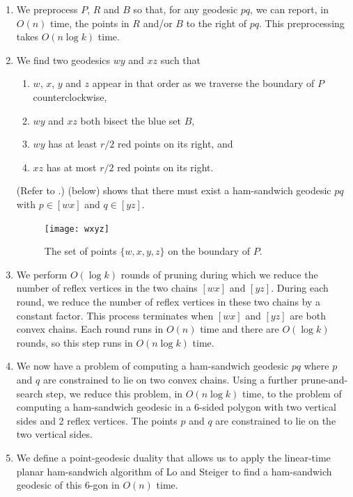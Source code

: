 \documentclass[charterfonts,lotsofwhite]{patmorin}
\newcommand{\chain}[2]{[#1#2]}
\begin{document}
\begin{enumerate}

\item We preprocess $P$, $R$ and $B$ so that, for any geodesic $pq$,
we can report, in $O(n)$ time, the points in $R$ and/or $B$ to the
right of $pq$.  This preprocessing takes $O(n \log k)$ time.

\item We find two geodesics $wy$ and $xz$ such that

\begin{enumerate}

\item $w$, $x$, $y$ and $z$ appear in that order as we traverse the
boundary of $P$ counterclockwise,

\item $wy$ and $xz$ both bisect the blue set $B$,

\item $wy$ has at least $r/2$ red points on its right, and

\item $xz$ has at most $r/2$ red points on its right.

\end{enumerate}

(Refer to .)  (below) shows that there
must exist a ham-sandwich geodesic $pq$ with $p\in \chain{w}{x}$ and
$q\in \chain{y}{z}$.

\begin{figure}[htbp]
\begin{center}\texttt{[image: wxyz]}\end{center}
\caption{The set of points $\{w,x,y,z\}$ on the boundary of $P$.}
\end{figure}

\item We perform $O(\log k)$ rounds of pruning during which we reduce
the number of reflex vertices in the two chains $\chain{w}{x}$ and
$\chain{y}{z}$.  During each round, we reduce the number of reflex
vertices in these two chains by a constant factor.  This process
terminates when $\chain{w}{x}$ and $\chain{y}{z}$ are both convex chains.
Each round runs in $O(n)$ time and there are $O(\log k)$ rounds, so
this step runs in $O(n\log k)$ time.

\item We now have a problem of computing a ham-sandwich geodesic $pq$
where $p$ and $q$ are constrained to lie on two convex chains.  Using
a further prune-and-search step, we reduce this problem, in $O(n\log
k)$ time, to the problem of computing a ham-sandwich geodesic in a
6-sided polygon with two vertical sides and 2 reflex vertices.  The
points $p$ and $q$ are constrained to lie on the two vertical sides.

\item We define a point-geodesic duality that allows us to apply the
linear-time planar ham-sandwich algorithm of Lo and Steiger
\cite{ls90} to find a ham-sandwich geodesic of this 6-gon in $O(n)$
time.  
\end{enumerate}
\end{document}
